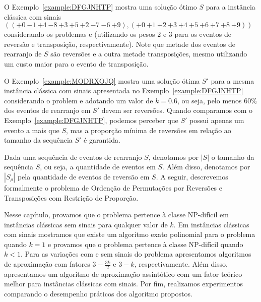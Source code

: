 O Exemplo~\ref{example:DFGJNHTP} mostra uma solução ótimo $S$ para a instância clássica com sinais $(({+0}~{-1}~{+4}~{-8}~{+3}~{+5}~{+2}~{-7}~{-6}~{+9}),({+0}~{+1}~{+2}~{+3}~{+4}~{+5}~{+6}~{+7}~{+8}~{+9}))$ considerando os problemas \SbRT{} e \SbWRT{} (utilizando os pesos $2$ e $3$ para os eventos de reversão e transposição, respectivamente). Note que metade dos eventos de rearranjo de $S$ são reversões e a outra metade transposições, mesmo utilizando um custo maior para o evento de transposição.



O Exemplo~\ref{example:MODRXOJQ} mostra uma solução ótima $S'$ para a mesma instância clássica com sinais apresentada no Exemplo~\ref{example:DFGJNHTP} considerando o problem \SbPRT{} e adotando um valor de $k = 0.6$, ou seja, pelo menos 60\% dos eventos de rearranjo em $S'$ devem ser reversões. Quando comparamos com o Exemplo~\ref{example:DFGJNHTP}, podemos perceber que $S'$ possui apenas um evento a mais que $S$, mas a proporção mínima de reversões em relação ao tamanho da sequência $S'$ é garantida.



Dada uma sequência de eventos de rearranjo $S$, denotamos por $|S|$ o tamanho da sequência $S$, ou seja, a quantidade de eventos em $S$. Além disso, denotamos por $|S_{\rho}|$ pela quantidade de eventos de reversão em $S$. A seguir, descrevemos formalmente o problema de Ordenção de Permutações por Reversões e Transposições com Restrição de Proporção.

\begin{task}
\end{task}

Nesse capítulo, provamos que o problema \SbPRT{} pertence à classe NP-difícil em instâncias clássicas sem sinais para qualquer valor de $k$. Em instâncias clássicas com sinais mostramos que existe um algoritmo exato polinomial para o problema quando $k=1$ e provamos que o problema pertence à classe NP-difícil quando $k < 1$. Para as variações com e sem sinais do problema \SbPRT{} apresentamos algoritmos de aproximação com fatores $3 - \frac{3k}{2}$ e $3-k$, respectivamente. Além disso, apresentamos um algoritmo de aproximação assintótico com um fator teórico melhor para instâncias clássicas com sinais. Por fim, realizamos experimentos comparando o desempenho práticos dos algoritmo propostos.  

